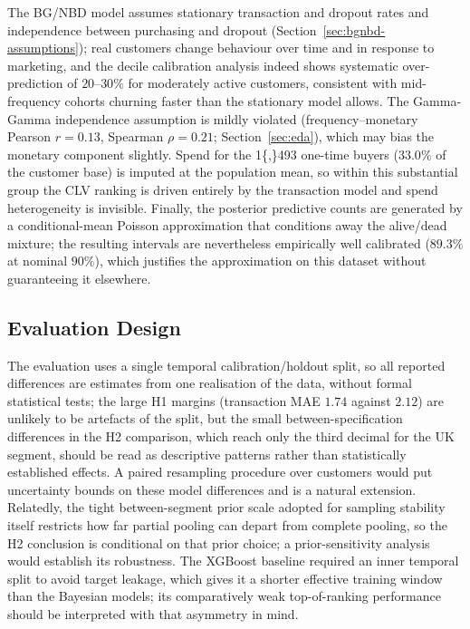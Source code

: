 The BG/NBD model assumes stationary transaction and dropout rates and independence between purchasing and dropout (Section~\ref{sec:bgnbd-assumptions}); real customers change behaviour over time and in response to marketing, and the decile calibration analysis indeed shows systematic over-prediction of $20$--$30\%$ for moderately active customers, consistent with mid-frequency cohorts churning faster than the stationary model allows. The Gamma-Gamma independence assumption is mildly violated (frequency--monetary Pearson $r = 0.13$, Spearman $\rho = 0.21$; Section~\ref{sec:eda}), which may bias the monetary component slightly. Spend for the \num{1{,}493} one-time buyers ($33.0\%$ of the customer base) is imputed at the population mean, so within this substantial group the CLV ranking is driven entirely by the transaction model and spend heterogeneity is invisible. Finally, the posterior predictive counts are generated by a conditional-mean Poisson approximation that conditions away the alive/dead mixture; the resulting intervals are nevertheless empirically well calibrated ($89.3\%$ at nominal $90\%$), which justifies the approximation on this dataset without guaranteeing it elsewhere.

\subsection{Evaluation Design}
\label{sec:limitations-eval}

The evaluation uses a single temporal calibration/holdout split, so all reported differences are estimates from one realisation of the data, without formal statistical tests; the large H1 margins (transaction MAE $1.74$ against $2.12$) are unlikely to be artefacts of the split, but the small between-specification differences in the H2 comparison, which reach only the third decimal for the UK segment, should be read as descriptive patterns rather than statistically established effects. A paired resampling procedure over customers would put uncertainty bounds on these model differences and is a natural extension. Relatedly, the tight between-segment prior scale adopted for sampling stability itself restricts how far partial pooling can depart from complete pooling, so the H2 conclusion is conditional on that prior choice; a prior-sensitivity analysis would establish its robustness. The XGBoost baseline required an inner temporal split to avoid target leakage, which gives it a shorter effective training window than the Bayesian models; its comparatively weak top-of-ranking performance should be interpreted with that asymmetry in mind.


